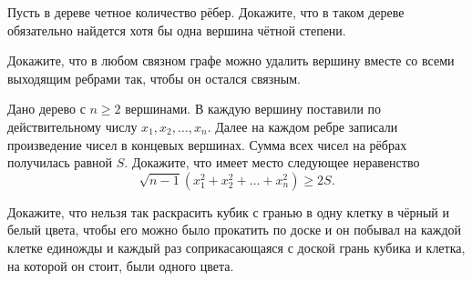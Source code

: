 \begin{exersize}
	Пусть в дереве четное количество рёбер. Докажите, что в таком дереве обязательно найдется хотя бы одна вершина чётной степени.
\end{exersize}	

\begin{exersize}
	Докажите, что в любом связном графе можно удалить вершину вместе со всеми выходящим ребрами так, чтобы он остался связным.
\end{exersize}	

\begin{exersize}
	Дано дерево с $n \geqslant 2$ вершинами. В каждую вершину поставили по действительному числу $x_1, x_2, \dots, x_n$. Далее на каждом ребре записали произведение чисел в концевых вершинах. Сумма всех чисел на рёбрах получилась равной $S$. Докажите, что имеет место следующее неравенство $$\sqrt{n-1} (x_1^2 + x_2^2 + \dots + x_n^2) \geqslant 2S.$$
\end{exersize}	

\begin{exersize}
	Докажите, что нельзя так раскрасить кубик с гранью в одну клетку в чёрный и белый цвета, чтобы его можно было прокатить по доске и он побывал на каждой клетке единожды и каждый раз соприкасающаяся с доской грань кубика и клетка, на которой он стоит, были одного цвета.
\end{exersize}	